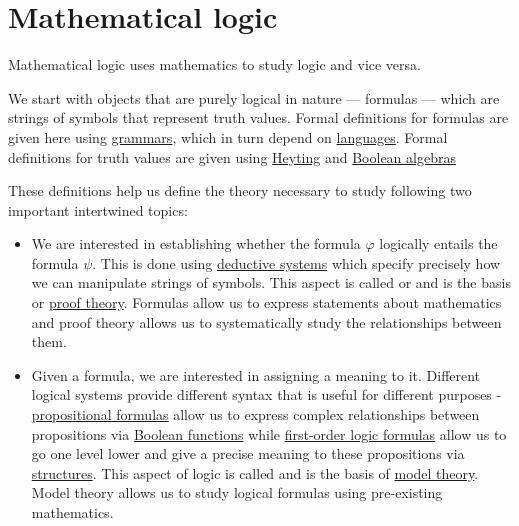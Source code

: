 \section{Mathematical logic}\label{sec:mathematical_logic}

Mathematical logic uses mathematics to study logic and vice versa.

We start with objects that are purely logical in nature --- formulas --- which are strings of symbols that represent truth values. Formal definitions for formulas are given here using \hyperref[def:formal_grammar]{grammars}, which in turn depend on \hyperref[def:formal_language]{languages}. Formal definitions for truth values are given using \hyperref[def:heyting_algebra]{Heyting} and \hyperref[def:boolean_algebra]{Boolean algebras}

These definitions help us define the theory necessary to study following two important intertwined topics:
\begin{itemize}
  \item We are interested in establishing whether the formula \( \varphi \) logically entails the formula \( \psi \). This is done using \hyperref[def:deductive_system]{deductive systems} which specify precisely how we can manipulate strings of symbols. This aspect is called  or  and is the basis or \hyperref[def:proof_derivability]{proof theory}. Formulas allow us to express statements about mathematics and proof theory allows us to systematically study the relationships between them.

  \item Given a formula, we are interested in assigning a meaning to it. Different logical systems provide different syntax that is useful for different purposes - \hyperref[def:propositional_syntax/formula]{propositional formulas} allow us to express complex relationships between propositions via \hyperref[subsec:boolean_functions]{Boolean functions} while \hyperref[def:first_order_syntax/formula]{first-order logic formulas} allow us to go one level lower and give a precise meaning to these propositions via \hyperref[def:first_order_structure]{structures}. This aspect of logic is called  and is the basis of \hyperref[subsec:first_order_models]{model theory}. Model theory allows us to study logical formulas using pre-existing mathematics.
\end{itemize}

